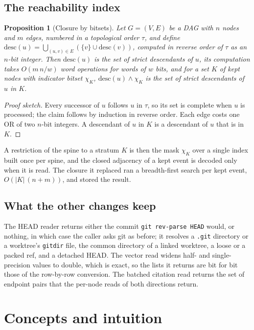 \documentclass[11pt]{article}
\theoremstyle{plain}
\newtheorem{proposition}[theorem]{Proposition}
\theoremstyle{definition}
\theoremstyle{remark}
\begin{document}
\subsection{The reachability index}

\begin{proposition}[Closure by bitsets]\label{prop:bits}
Let $G = (V, E)$ be a DAG with $n$ nodes and $m$ edges, numbered in a topological order $\tau$, and
define $\mathrm{desc}(u) = \bigcup_{(u,v) \in E} (\{v\} \cup \mathrm{desc}(v))$, computed in reverse
order of $\tau$ as an $n$-bit integer. Then $\mathrm{desc}(u)$ is the set of strict descendants of
$u$, its computation takes $O(m\, n / w)$ word operations for words of $w$ bits, and for a set $K$
of kept nodes with indicator bitset $\chi_K$, $\mathrm{desc}(u) \wedge \chi_K$ is the set of strict
descendants of $u$ in $K$.
\end{proposition}
\begin{proof}[Proof sketch]
Every successor of $u$ follows $u$ in $\tau$, so its set is complete when $u$ is processed; the
claim follows by induction in reverse order. Each edge costs one OR of two $n$-bit integers. A
descendant of $u$ in $K$ is a descendant of $u$ that is in $K$.
\end{proof}

A restriction of the spine to a stratum $K$ is then the mask $\chi_K$ over a single index built once
per spine, and the closed adjacency of a kept event is decoded only when it is read. The closure it
replaced ran a breadth-first search per kept event, $O(|K|\,(n + m))$, and stored the result.

\subsection{What the other changes keep}

The HEAD reader returns either the commit \texttt{git rev-parse HEAD} would, or nothing, in which
case the caller asks git as before; it resolves a \texttt{.git} directory or a worktree's
\texttt{gitdir} file, the common directory of a linked worktree, a loose or a packed ref, and a
detached HEAD. The vector read widens half- and single-precision values to double, which is exact,
so the lists it returns are bit for bit those of the row-by-row conversion. The batched citation
read returns the set of endpoint pairs that the per-node reads of both directions return.

\section{Concepts and intuition}
\end{document}
